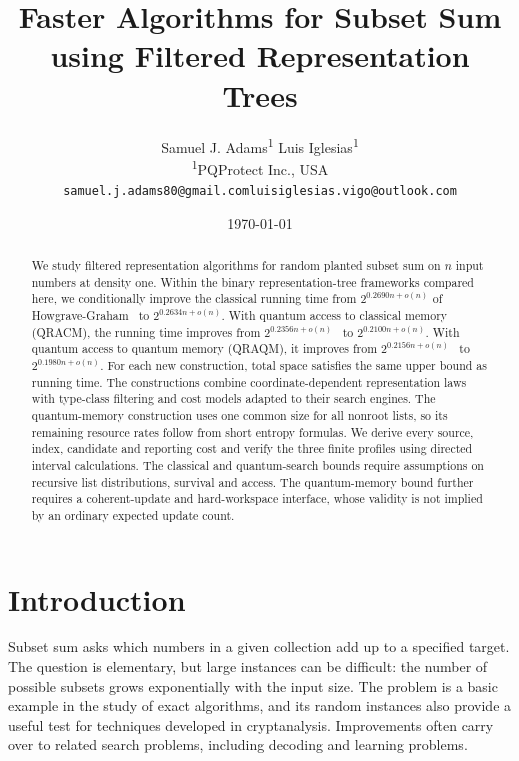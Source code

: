 \documentclass[10pt,a4paper]{article}
\title{\bfseries Faster Algorithms for Subset Sum \\using Filtered Representation Trees}
\author{Samuel J. Adams\textsuperscript{1} \quad Luis Iglesias\textsuperscript{1}\\[0.35em]
{\small\textsuperscript{1}PQProtect Inc., USA}\\[0.35em]
{\footnotesize\texttt{samuel.j.adams80@gmail.com}\quad\texttt{luisiglesias.vigo@outlook.com}}}
\date{\today}
\theoremstyle{definition}
\begin{document}
\maketitle

\begin{abstract}
We study filtered representation algorithms for random planted subset sum
on $n$ input numbers at density one. Within the binary representation-tree
frameworks compared here, we conditionally improve the classical running
time from $2^{0.2690n+o(n)}$ of
Howgrave-Graham~\cite[Theorem~7]{HG26} to $2^{0.2634n+o(n)}$.
With quantum access to classical memory (QRACM), the running time improves
from $2^{0.2356n+o(n)}$~\cite[Section~4.3 and Table~2]{BBSS} to
$2^{0.2100n+o(n)}$. With quantum access to quantum memory (QRAQM),
it improves from $2^{0.2156n+o(n)}$~\cite[Section~5.3]{BBSS} to
$2^{0.1980n+o(n)}$. For each new construction, total space satisfies
the same upper bound as running time. The constructions combine
coordinate-dependent representation laws with type-class filtering and
cost models adapted to their search engines. The quantum-memory
construction uses one common size for all nonroot lists, so its remaining
resource rates follow from short entropy formulas. We derive every
source, index, candidate and reporting cost and verify the three finite
profiles using directed interval calculations. The classical and
quantum-search bounds require assumptions on recursive list
distributions, survival and access. The quantum-memory bound further
requires a coherent-update and hard-workspace interface, whose validity
is not implied by an ordinary expected update count.
\end{abstract}

\let\thefootnote\relax{}

\section{Introduction}
Subset sum asks which numbers in a given collection add up to a specified
target. The question is elementary, but large instances can be difficult:
the number of possible subsets grows exponentially with the input size.
The problem is a basic example in the study of exact algorithms, and its
random instances also provide a useful test for techniques developed in
cryptanalysis. Improvements often carry over to related search problems,
including decoding and learning problems.
\end{document}
